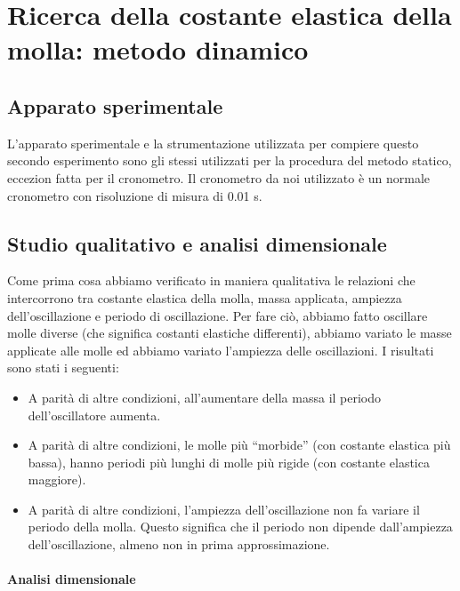 \section{Ricerca della costante elastica della molla: metodo dinamico}

\subsection{Apparato sperimentale}

L'apparato sperimentale e la strumentazione utilizzata per compiere questo secondo esperimento sono gli stessi utilizzati per la procedura del metodo statico, eccezion fatta per il cronometro. Il cronometro da noi utilizzato è un normale cronometro con risoluzione di misura di 0.01 s.

\subsection{Studio qualitativo e analisi dimensionale}

Come prima cosa abbiamo verificato in maniera qualitativa le relazioni che intercorrono tra
costante elastica della molla, massa applicata, ampiezza dell'oscillazione e periodo di oscillazione.
Per fare ciò, abbiamo fatto oscillare molle diverse (che significa costanti elastiche differenti), abbiamo variato
le masse applicate alle molle ed abbiamo variato l'ampiezza delle oscillazioni. I risultati sono stati
i seguenti:

\begin{itemize}
    \item{A parità di altre condizioni, all'aumentare della massa il periodo dell'oscillatore aumenta.}
    \item{A parità di altre condizioni, le molle più ``morbide'' (con costante elastica più bassa), hanno periodi più lunghi
        di molle più rigide (con costante elastica maggiore).}
    \item{A parità di altre condizioni, l'ampiezza dell'oscillazione non fa variare il periodo della molla. Questo significa
        che il periodo non dipende dall'ampiezza dell'oscillazione, almeno non in prima approssimazione.}
\end{itemize}

\paragraph{Analisi dimensionale\\}

